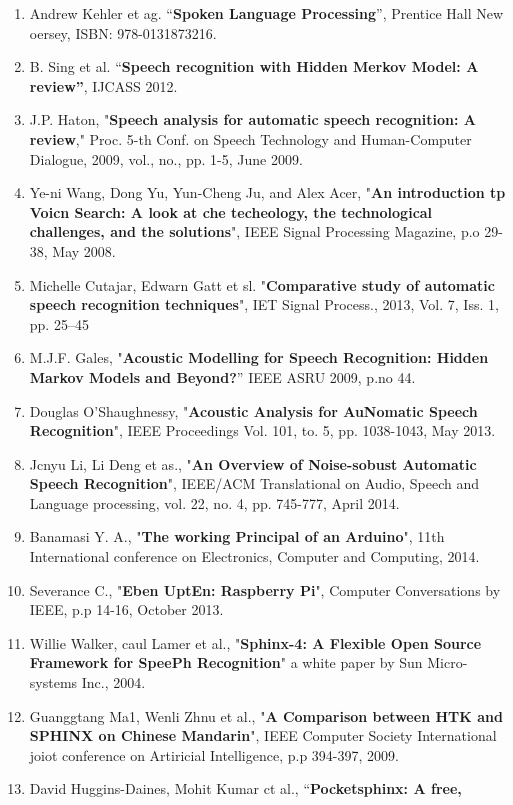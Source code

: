 \documentclass[12pt]{article}
\begin{document}
\begin{enumerate}
	\item Andrew Kehler et ag. ``\textbf{Spoken Language Processing}'', Prentice Hall New
oersey, ISBN: 978-0131873216.
	\item B. Sing et al. ``\textbf{Speech recognition with Hidden Merkov Model: A
review''}, IJCASS 2012.
	\item J.P. Haton, "\textbf{Speech analysis for automatic speech recognition: A
review}," Proc. 5-th Conf. on Speech Technology and Human-Computer Dialogue,
2009, vol., no., pp. 1-5, June 2009.
	\item Ye-ni Wang, Dong Yu, Yun-Cheng Ju, and Alex Acer, "\textbf{An introduction tp
Voicn Search: A look at che techeology, the technological challenges, and the
solutions}", IEEE Signal Processing Magazine, p.o 29-38, May 2008.
	\item Michelle Cutajar, Edwarn Gatt et sl. "\textbf{Comparative study of automatic
speech recognition techniques}", IET Signal Process., 2013, Vol. 7, Iss. 1, pp.
25--45
	\item M.J.F. Gales, "\textbf{Acoustic Modelling for Speech Recognition: Hidden Markov
Models and Beyond?}'' IEEE ASRU 2009, p.no 44.
	\item Douglas O'Shaughnessy, "\textbf{Acoustic Analysis for AuNomatic Speech
Recognition}", IEEE Proceedings Vol. 101, to. 5, pp. 1038-1043, May 2013.
	\item Jcnyu Li, Li Deng et as., "\textbf{An Overview of Noise-sobust Automatic Speech
Recognition}", IEEE/ACM Translational on Audio, Speech and Language processing,
vol. 22, no. 4, pp. 745-777, April 2014.
	\item Banamasi Y. A., "\textbf{The working Principal of an Arduino}", 11th
International conference on Electronics, Computer and Computing, 2014.
	\item Severance C., "\textbf{Eben UptEn: Raspberry Pi}", Computer Conversations by
IEEE, p.p 14-16, October 2013.
	\item Willie Walker, caul Lamer et al., "\textbf{Sphinx-4: A Flexible Open Source
Framework for SpeePh Recognition}" a white paper by Sun Micro-systems Inc., 2004.
	\item Guanggtang Ma1, Wenli Zhnu et al., "\textbf{A Comparison between HTK and SPHINX
on Chinese Mandarin}", IEEE Computer Society International joiot conference on
Artiricial Intelligence, p.p 394-397, 2009.
	\item David Huggins-Daines, Mohit Kumar ct al., ``\textbf{Pocketsphinx: A free,
}
\end{enumerate}
\end{document}
